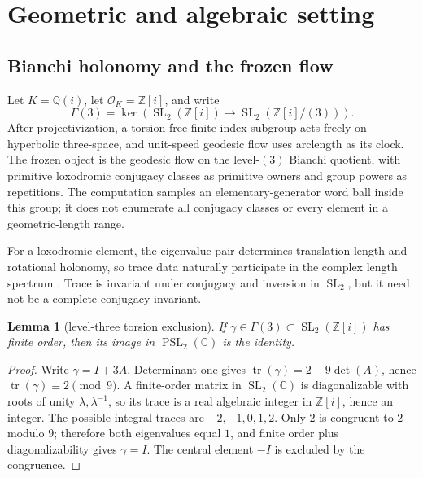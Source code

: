 \documentclass[11pt,a4paper]{article}
\newtheorem{lemma}[theorem]{Lemma}
\theoremstyle{definition}
\theoremstyle{remark}
\newcommand{\SL}{\operatorname{SL}}
\newcommand{\tr}{\operatorname{tr}}
\newcommand{\Gauss}{\mathbb{Z}[i]}
\begin{document}
\section{Geometric and algebraic setting}

\subsection{Bianchi holonomy and the frozen flow}

Let \(K=\mathbb{Q}(i)\), let \(\mathcal O_K=\Gauss\), and write
\[
 \Gamma(3)=\ker\!\left(\SL_2(\Gauss)\longrightarrow\SL_2(\Gauss/(3))\right).
\]
After projectivization, a torsion-free finite-index subgroup acts freely on hyperbolic three-space, and unit-speed geodesic flow uses arclength as its clock. The frozen object is the geodesic flow on the level-\((3)\) Bianchi quotient, with primitive loxodromic conjugacy classes as primitive owners and group powers as repetitions. The computation samples an elementary-generator word ball inside this group; it does not enumerate all conjugacy classes or every element in a geometric-length range.

For a loxodromic element, the eigenvalue pair determines translation length and rotational holonomy, so trace data naturally participate in the complex length spectrum \citep[Introduction and Sec.~2]{LinLipnowski2022}. Trace is invariant under conjugacy and inversion in \(\SL_2\), but it need not be a complete conjugacy invariant.

\begin{lemma}[level-three torsion exclusion]\label{lem:torsion}
If \(\gamma\in\Gamma(3)\subset\SL_2(\Gauss)\) has finite order, then its image in \(\operatorname{PSL}_2(\mathbb C)\) is the identity.
\end{lemma}

\begin{proof}
Write \(\gamma=I+3A\). Determinant one gives \(\tr(\gamma)=2-9\det(A)\), hence \(\tr(\gamma)\equiv2\pmod 9\). A finite-order matrix in \(\SL_2(\mathbb C)\) is diagonalizable with roots of unity \(\lambda,\lambda^{-1}\), so its trace is a real algebraic integer in \(\Gauss\), hence an integer. The possible integral traces are \(-2,-1,0,1,2\). Only \(2\) is congruent to \(2\) modulo \(9\); therefore both eigenvalues equal \(1\), and finite order plus diagonalizability gives \(\gamma=I\). The central element \(-I\) is excluded by the congruence.
\end{proof}
\end{document}
